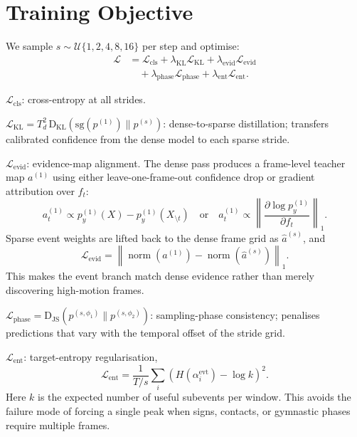 \documentclass[10pt,twocolumn]{article}
\begin{document}
\section{Training Objective}
\label{sec:training}

We sample $s \sim \mathcal{U}\{1,2,4,8,16\}$ per step and optimise:
\begin{align}
    \mathcal{L} &= \mathcal{L}_{\mathrm{cls}}
    + \lambda_{\mathrm{KL}}\mathcal{L}_{\mathrm{KL}}
    + \lambda_{\mathrm{evid}}\mathcal{L}_{\mathrm{evid}} \nonumber\\
    &\quad + \lambda_{\mathrm{phase}}\mathcal{L}_{\mathrm{phase}}
    + \lambda_{\mathrm{ent}}\mathcal{L}_{\mathrm{ent}}.
\end{align}

\noindent$\mathcal{L}_{\mathrm{cls}}$: cross-entropy at all strides.

\noindent$\mathcal{L}_{\mathrm{KL}} = T_d^2\,\mathrm{D}_{\mathrm{KL}}\!\left(\mathrm{sg}(p^{(1)}) \| p^{(s)}\right)$:
dense-to-sparse distillation; transfers calibrated confidence from the dense
model to each sparse stride.

\noindent$\mathcal{L}_{\mathrm{evid}}$: evidence-map alignment.
The dense pass produces a frame-level teacher map $a^{(1)}$ using either
leave-one-frame-out confidence drop or gradient attribution over $f_t$:
\[
    a_t^{(1)} \propto
    p_y^{(1)}(X) - p_y^{(1)}(X_{\setminus t})
    \quad \text{or} \quad
    a_t^{(1)} \propto \left\|\frac{\partial \log p_y^{(1)}}{\partial f_t}\right\|_1 .
\]
Sparse event weights are lifted back to the dense frame grid as
$\hat{a}^{(s)}$, and
\[
    \mathcal{L}_{\mathrm{evid}} =
    \left\|\operatorname{norm}(a^{(1)}) -
    \operatorname{norm}(\hat{a}^{(s)})\right\|_1 .
\]
This makes the event branch match dense evidence rather than merely discovering
high-motion frames.

\noindent$\mathcal{L}_{\mathrm{phase}} = \mathrm{D}_{\mathrm{JS}}\!\left(p^{(s,\phi_1)} \| p^{(s,\phi_2)}\right)$:
sampling-phase consistency; penalises predictions that vary with the temporal
offset of the stride grid.

\noindent$\mathcal{L}_{\mathrm{ent}}$: target-entropy regularisation,
\[
    \mathcal{L}_{\mathrm{ent}} =
    \frac{1}{T/s}\sum_i \left(H(\alpha_i^{\mathrm{evt}}) - \log k\right)^2 .
\]
Here $k$ is the expected number of useful subevents per window. This avoids the
failure mode of forcing a single peak when signs, contacts, or gymnastic phases
require multiple frames.
\end{document}
